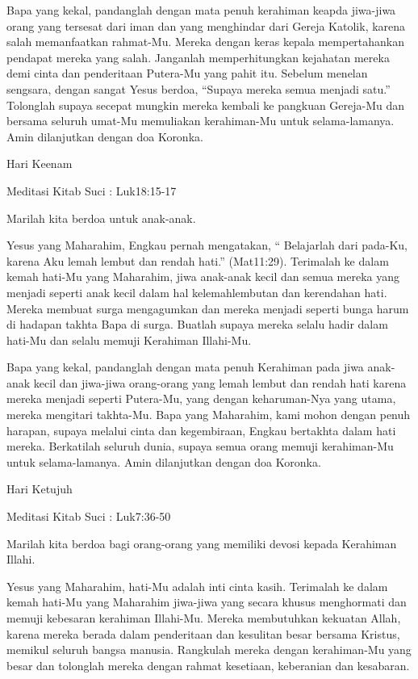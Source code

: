 \documentclass[a5paper,headsepline,titlepage,11pt,nnormalheadings,DIVcalc]{scrbook}
\begin{document}
Bapa yang kekal, pandanglah dengan mata penuh kerahiman keapda jiwa-jiwa orang yang tersesat dari iman dan yang menghindar dari Gereja Katolik, karena salah memanfaatkan rahmat-Mu. Mereka dengan keras kepala mempertahankan pendapat mereka yang salah. Janganlah memperhitungkan kejahatan mereka demi cinta dan penderitaan Putera-Mu yang pahit itu. Sebelum menelan sengsara, dengan sangat Yesus berdoa, “Supaya mereka semua menjadi satu.” Tolonglah supaya secepat mungkin mereka kembali ke pangkuan Gereja-Mu dan bersama seluruh umat-Mu memuliakan kerahiman-Mu untuk selama-lamanya. Amin
dilanjutkan dengan doa Koronka.


Hari Keenam

Meditasi Kitab Suci : Luk18:15-17

Marilah kita berdoa untuk anak-anak.

Yesus yang Maharahim, Engkau pernah mengatakan, “ Belajarlah dari pada-Ku, karena Aku lemah lembut dan rendah hati.” (Mat11:29). Terimalah ke dalam kemah hati-Mu yang Maharahim, jiwa anak-anak kecil dan semua mereka yang menjadi seperti anak kecil dalam hal kelemahlembutan dan kerendahan hati. Mereka membuat surga mengagumkan dan mereka menjadi seperti bunga harum di hadapan takhta Bapa di surga. Buatlah supaya mereka selalu hadir dalam hati-Mu dan selalu memuji Kerahiman Illahi-Mu.

Bapa yang kekal, pandanglah dengan mata penuh Kerahiman pada jiwa anak-anak kecil dan jiwa-jiwa orang-orang yang lemah lembut dan rendah hati karena mereka menjadi seperti Putera-Mu, yang dengan keharuman-Nya yang utama, mereka mengitari takhta-Mu. Bapa yang Maharahim, kami mohon dengan penuh harapan, supaya melalui cinta dan kegembiraan, Engkau bertakhta dalam hati mereka. Berkatilah seluruh dunia, supaya semua orang memuji kerahiman-Mu untuk selama-lamanya. Amin
dilanjutkan dengan doa Koronka.


Hari Ketujuh

Meditasi Kitab Suci : Luk7:36-50

Marilah kita berdoa bagi orang-orang yang memiliki devosi kepada Kerahiman Illahi.

Yesus yang Maharahim, hati-Mu adalah inti cinta kasih. Terimalah ke dalam kemah hati-Mu yang Maharahim jiwa-jiwa yang secara khusus menghormati dan memuji kebesaran kerahiman Illahi-Mu. Mereka membutuhkan kekuatan Allah, karena mereka berada dalam penderitaan dan kesulitan besar bersama Kristus, memikul seluruh bangsa manusia. Rangkulah mereka dengan kerahiman-Mu yang besar dan tolonglah mereka dengan rahmat kesetiaan, keberanian dan kesabaran.
\end{document}
